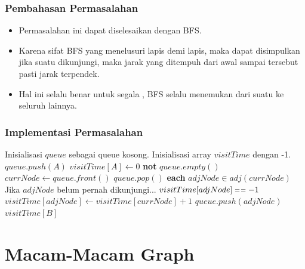 \begin{frame}
\frametitle{Pembahasan Permasalahan}
\begin{itemize}
  \item Permasalahan ini dapat diselesaikan dengan BFS. 
  \item Karena sifat BFS yang menelusuri \fnode lapis demi lapis, maka dapat disimpulkan jika suatu \fnode dikunjungi, maka jarak yang ditempuh dari awal sampai \fnode tersebut pasti jarak terpendek.
  \item Hal ini selalu benar untuk segala  \fgraph, BFS selalu menemukan  dari suatu \fnode ke seluruh \fnode lainnya.
\end{itemize}
\end{frame}

\begin{frame}[fragile]
\frametitle{Implementasi Permasalahan}
\begin{codebox}
  \li \Comment Inisialisasi $queue$ sebagai queue kosong.
  \li \Comment Inisialisasi array $visitTime$ dengan -1.
  \li $queue.push(A)$
  \li $visitTime[A] \gets 0$
  \li \While \textbf{not} $queue.empty()$ \Do
  \li   $currNode \gets queue.front()$
  \li   $queue.pop()$
  \li   \For \textbf{each} $adjNode \in adj(currNode)$ \Do
  \li     \Comment Jika $adjNode$ belum pernah dikunjungi...
  \li     \If $visitTime[adjNode] \isequal -1$ \Then
  \li       $visitTime[adjNode] \gets visitTime[currNode] + 1$
  \li       $queue.push(adjNode)$
          \End
        \End
      \End
  \li \Return $visitTime[B]$
\end{codebox}
\end{frame}

\section{Macam-Macam Graph}
\frame{\sectionpage}

